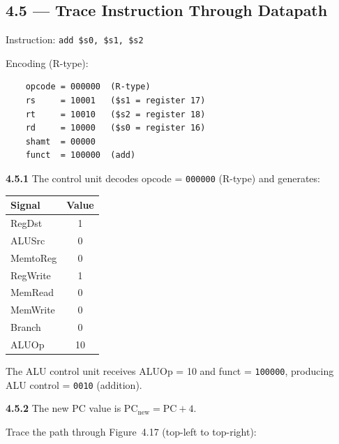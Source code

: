\subsection*{4.5 --- Trace Instruction Through Datapath}
\hypertarget{sol-4.5}{}

Instruction: \texttt{add \$s0, \$s1, \$s2}

Encoding (R-type):
\begin{verbatim}
    opcode = 000000  (R-type)
    rs     = 10001   ($s1 = register 17)
    rt     = 10010   ($s2 = register 18)
    rd     = 10000   ($s0 = register 16)
    shamt  = 00000
    funct  = 100000  (add)
\end{verbatim}

\medskip\noindent\textbf{4.5.1}
The control unit decodes opcode = \texttt{000000} (R-type) and generates:

\begin{center}
\begin{tabular}{lc}
\toprule
\textbf{Signal} & \textbf{Value} \\
\midrule
RegDst   & 1 \\
ALUSrc   & 0 \\
MemtoReg & 0 \\
RegWrite & 1 \\
MemRead  & 0 \\
MemWrite & 0 \\
Branch   & 0 \\
ALUOp    & 10 \\
\bottomrule
\end{tabular}
\end{center}

The ALU control unit receives ALUOp = 10 and funct = \texttt{100000},
producing ALU control = \texttt{0010} (addition).

\medskip\noindent\textbf{4.5.2}
The new PC value is $\text{PC}_{\text{new}} = \text{PC} + 4$.

Trace the path through Figure~4.17 (top-left to top-right):

